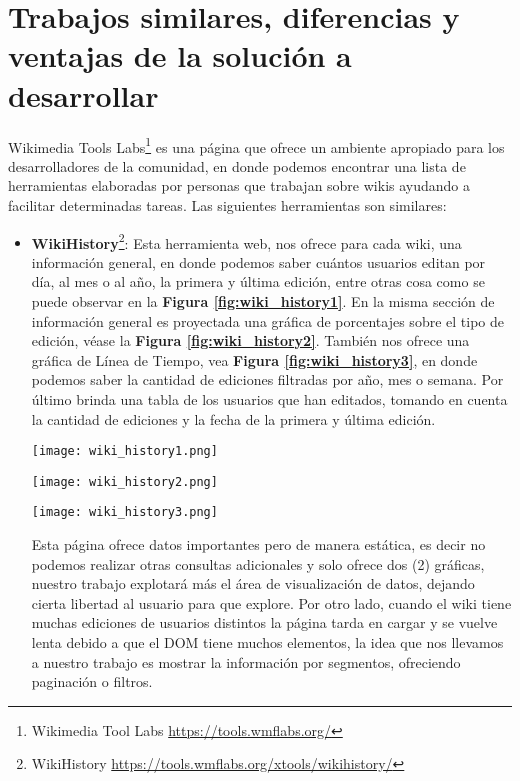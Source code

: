 \section{Trabajos similares, diferencias y ventajas de la solución a desarrollar}
Wikimedia Tools Labs\footnote{Wikimedia Tool Labs \url{https://tools.wmflabs.org/}} es una página que ofrece un ambiente apropiado para los desarrolladores de la comunidad, en donde podemos encontrar una lista de herramientas elaboradas por personas que trabajan sobre wikis ayudando a facilitar determinadas tareas. Las siguientes herramientas son similares:
\begin{itemize}
\item\textbf{WikiHistory}\footnote{WikiHistory \url{https://tools.wmflabs.org/xtools/wikihistory/}}:
Esta herramienta web, nos ofrece para cada wiki, una información general, en donde podemos saber cuántos usuarios editan por día, al mes o al año, la primera y última edición, entre otras cosa como se puede observar en la \textbf{Figura \ref{fig:wiki_history1}}. En la misma sección de información general es proyectada una gráfica de porcentajes sobre el tipo de edición, véase la \textbf{Figura \ref{fig:wiki_history2}}. También nos ofrece una gráfica de Línea de Tiempo, vea \textbf{Figura \ref{fig:wiki_history3}}, en donde podemos saber la cantidad de ediciones filtradas por año, mes o semana. Por último brinda una tabla de los usuarios que han editados, tomando en cuenta la cantidad de ediciones y la fecha de la primera y última edición. 
\bigbreak
\begin{center}
\texttt{[image: wiki\_history1.png]}
\label{fig:wiki_history1}
\end{center}
\bigbreak
\begin{center}
\texttt{[image: wiki\_history2.png]}
\label{fig:wiki_history2}
\end{center}
\bigbreak
\begin{center}
\texttt{[image: wiki\_history3.png]}
\label{fig:wiki_history3}
\end{center}
\bigbreak
Esta página ofrece datos importantes pero de manera estática, es decir no podemos realizar otras consultas adicionales y solo ofrece dos (2) gráficas, nuestro trabajo explotará más el área de visualización de datos, dejando cierta libertad al usuario para que explore. Por otro lado, cuando el wiki tiene muchas ediciones de usuarios distintos la página tarda en cargar y se vuelve lenta debido a que el DOM tiene muchos elementos, la idea que nos llevamos a nuestro trabajo es mostrar la información por segmentos, ofreciendo paginación o filtros.


\end{itemize}
